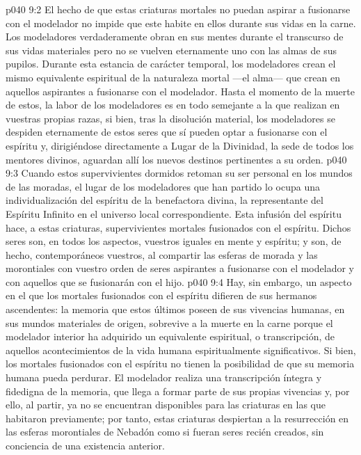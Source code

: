 \vs p040 9:2 \pc El hecho de que estas criaturas mortales no puedan aspirar a fusionarse con el modelador no impide que este habite en ellos durante sus vidas en la carne. Los modeladores verdaderamente obran en sus mentes durante el transcurso de sus vidas materiales pero no se vuelven eternamente uno con las almas de sus pupilos. Durante esta estancia de carácter temporal, los modeladores crean el mismo equivalente espiritual de la naturaleza mortal ---el alma--- que crean en aquellos aspirantes a fusionarse con el modelador. Hasta el momento de la muerte de estos, la labor de los modeladores es en todo semejante a la que realizan en vuestras propias razas, si bien, tras la disolución material, los modeladores se despiden eternamente de estos seres que sí pueden optar a fusionarse con el espíritu y, dirigiéndose directamente a Lugar de la Divinidad, la sede de todos los mentores divinos, aguardan allí los nuevos destinos pertinentes a su orden.
\vs p040 9:3 Cuando estos supervivientes dormidos retoman su ser personal en los mundos de las moradas, el lugar de los modeladores que han partido lo ocupa una individualización del espíritu de la benefactora divina, la representante del Espíritu Infinito en el universo local correspondiente. Esta infusión del espíritu hace, a estas criaturas, supervivientes mortales fusionados con el espíritu. Dichos seres son, en todos los aspectos, vuestros iguales en mente y espíritu; y son, de hecho, contemporáneos vuestros, al compartir las esferas de morada y las morontiales con vuestro orden de seres aspirantes a fusionarse con el modelador y con aquellos que se fusionarán con el hijo.
\vs p040 9:4 \pc Hay, sin embargo, un aspecto en el que los mortales fusionados con el espíritu difieren de sus hermanos ascendentes: la memoria que estos últimos poseen de sus vivencias humanas, en sus mundos materiales de origen, sobrevive a la muerte en la carne porque el modelador interior ha adquirido un equivalente espiritual, o transcripción, de aquellos acontecimientos de la vida humana espiritualmente significativos. Si bien, los mortales fusionados con el espíritu no tienen la posibilidad de que su memoria humana pueda perdurar. El modelador realiza una transcripción íntegra y fidedigna de la memoria, que llega a formar parte de sus propias vivencias y, por ello, al partir, ya no se encuentran disponibles para las criaturas en las que habitaron previamente; por tanto, estas criaturas despiertan a la resurrección en las esferas morontiales de Nebadón como si fueran seres recién creados, sin conciencia de una existencia anterior.
